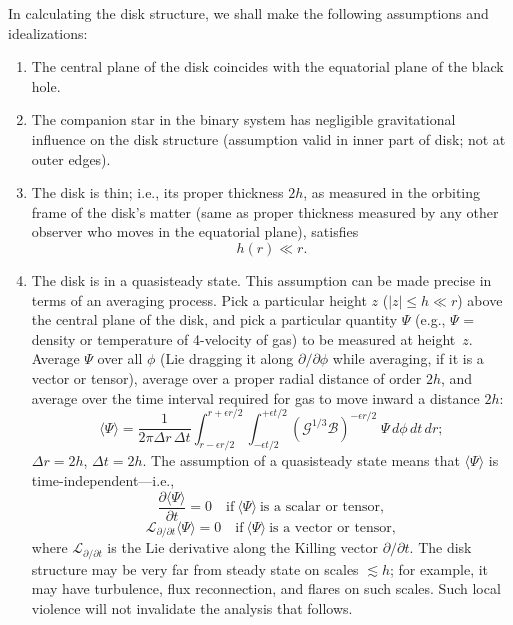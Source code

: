 In calculating the disk structure, we shall make the following assumptions
and idealizations:

\begin{enumerate}
\item[(i)] The central plane of the disk coincides with the equatorial plane of the
black hole.

\item[(ii)] The companion star in the binary system has negligible gravitational
influence on the disk structure (assumption valid in inner part of disk;
not at outer edges).

\item[(iii)] The disk is thin; i.e., its proper thickness $2h$, as measured in the orbiting
frame of the disk's matter (same as proper thickness measured by any
other observer who moves in the equatorial plane), satisfies
%
\begin{equation}
h(r) \ll r.
\tag{5.5.1}
\end{equation}

\item[(iv)] The disk is in a quasisteady state.  This assumption can be made precise
in terms of an averaging process.  Pick a particular height $z$ ($|z| \leq h \ll r$)
above the central plane of the disk, and pick a particular quantity $\Psi$
(e.g., $\Psi$ = density or temperature of 4-velocity of gas) to be measured at
height~$z$.  Average $\Psi$ over all $\phi$ (Lie dragging it along $\partial/\partial\phi$ while averaging,
if it is a vector or tensor), average over a proper radial distance of order
$2h$, and average over the time interval required for gas to move inward
a distance $2h$:
%
\begin{equation}
\langle\Psi\rangle = \frac{1}{2\pi\Delta r\,\Delta t}
\int_{r-\epsilon r/2}^{r+\epsilon r/2}
\int_{-\epsilon t/2}^{+\epsilon t/2}
\left(\mathscr{G}^{1/3}\mathscr{B}\right)^{-\epsilon r/2}
\;\Psi\,d\phi\,dt\,dr;
\tag{5.5.2}
\end{equation}
%
$\Delta r = 2h$, $\Delta t = 2h$.  The assumption of a quasisteady state means
that $\langle\Psi\rangle$ is time-independent---i.e.,
%
\begin{equation}
\frac{\partial\langle\Psi\rangle}{\partial t} = 0
\quad\text{if}~\langle\Psi\rangle~\text{is a scalar or tensor},
\tag{5.5.3}
\end{equation}
%
\begin{equation}
\mathscr{L}_{\partial/\partial t}\langle\Psi\rangle = 0
\quad\text{if}~\langle\Psi\rangle~\text{is a vector or tensor},
\end{equation}
%
where $\mathscr{L}_{\partial/\partial t}$ is the Lie derivative along the Killing vector
$\partial/\partial t$.  The
disk structure may be very far from steady state on scales $\lesssim h$; for
example, it may have turbulence, flux reconnection, and flares on such
scales.  Such local violence will not invalidate the analysis that follows.


\end{enumerate}
